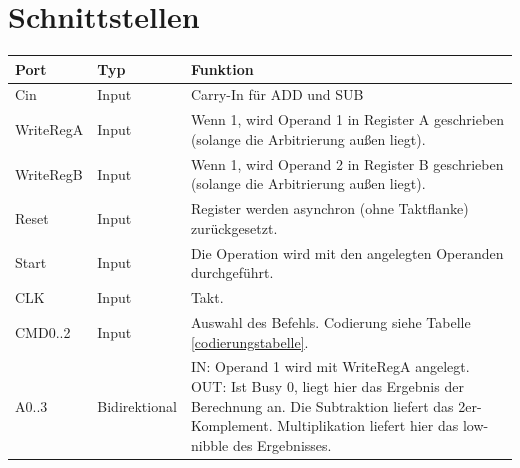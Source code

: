 \documentclass[11pt]{report}
\begin{document}
	\section{Schnittstellen}
	\begin{table}[h]
		\centering
		\begin{tabular}{|l|l|p{11cm}|}
			\hline
			Port      & Typ           & Funktion                                                                                                                                                                                                       \\ \hline\hline
			Cin       & Input         & Carry-In für ADD und SUB                                                                                                                                                                                       \\ \hline
			WriteRegA & Input         & Wenn 1, wird Operand 1 in Register A geschrieben (solange die Arbitrierung außen liegt).                                                                                                                       \\ \hline
			WriteRegB & Input         & Wenn 1, wird Operand 2 in Register B geschrieben (solange die Arbitrierung außen liegt).                                                                                                                       \\ \hline
			Reset     & Input         & Register werden asynchron (ohne Taktflanke) zurückgesetzt.                                                                                                                                                     \\ \hline
			Start     & Input         & Die Operation wird mit den angelegten Operanden durchgeführt.                                                                                                                                                  \\ \hline
			CLK       & Input         & Takt.                                                                                                                                                                                                          \\ \hline
			CMD0..2   & Input         & Auswahl des Befehls. Codierung siehe Tabelle \ref{codierungstabelle}.\\ \hline
			A0..3     & Bidirektional & IN: Operand 1 wird mit WriteRegA angelegt. OUT: Ist Busy 0, liegt hier das Ergebnis der Berechnung an. Die Subtraktion liefert das 2er-Komplement. Multiplikation liefert hier das low-nibble des Ergebnisses. \\ \hline

\end{tabular}
\end{table}
\end{document}
